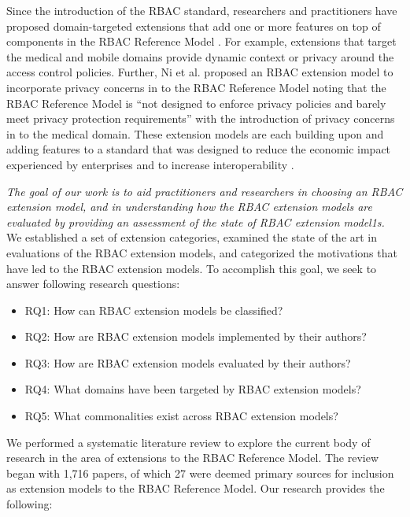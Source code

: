 Since the introduction of the RBAC standard, researchers and practitioners have proposed domain-targeted extensions that add one or more features on top of components in the RBAC Reference Model \cite{kuhn2010adding}.
For example, extensions that target the medical and mobile domains provide dynamic context or privacy around the access control policies.
Further, Ni et al. \cite{ni2010privacy} proposed an RBAC extension model to incorporate privacy concerns in to the RBAC Reference Model noting that the RBAC Reference Model is ``not designed to enforce privacy policies and barely meet privacy protection requirements'' with the introduction of privacy concerns in to the medical domain.
These extension models are each building upon and adding features to a standard that was designed to reduce the economic impact experienced by enterprises and to increase interoperability \cite{o20102010}.

\textit{The goal of our work is to aid practitioners and researchers in choosing an RBAC extension model, and in understanding
how the RBAC extension models are evaluated by providing an assessment of the state of RBAC extension model1s.} We established a set of extension categories, examined the state of the art in evaluations of the RBAC extension models, and categorized the motivations that have led to the RBAC extension models.
To accomplish this goal, we seek to answer following research questions:

\begin{itemize}
\setlength{\itemsep}{0.25pt}
\item RQ1: How can RBAC extension models be classified?
\item RQ2: How are RBAC extension models implemented by their authors?
\item RQ3: How are RBAC extension models evaluated by their authors?
\item RQ4: What domains have been targeted by RBAC extension models?
\item RQ5: What commonalities exist across RBAC extension models?
\end{itemize}

We performed a systematic literature review to explore the current body of research in the area of extensions to the RBAC Reference Model. 
The review began with 1,716 papers, of which 27 were deemed primary sources for inclusion as extension models to the RBAC Reference Model.
Our research provides the following:

